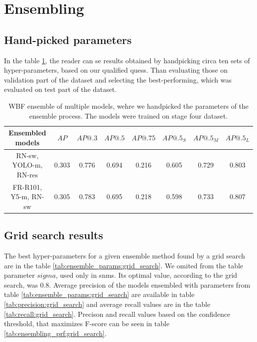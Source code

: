 \section{Ensembling}
\label{sec:ensembling_results}
\subsection{Hand-picked parameters}
In the table \ref{tab:model_ensembling:handpicked}, the reader can se results obtained by handpicking circa ten sets of hyper-parameters, based on our qualified quess. Than evaluating those on validation part of the dataset and selecting the best-performing, which was evaluated on test part of the dataset.
\begin{table}[H]
    \begin{tabular}{|c|c|c|c|c|c|c|c|}
        \hline
        Ensembled models      & $AP$  & $AP@.3$ & $AP@.5$ & $AP@.75$ & $AP@.5_S$ & $AP@.5_M$ & $AP@.5_L$ \\ \hline
        RN-sw, YOLO-m, RN-res & 0.303 & 0.776   & 0.694   & 0.216    & 0.605     & 0.729     & 0.803     \\ \hline
        FR-R101, Y5-m, RN-sw  & 0.305 & 0.783   & 0.695   & 0.218    & 0.598     & 0.733     & 0.807     \\ \hline
    \end{tabular}
    \caption{WBF ensemble of multiple models, wehre we handpicked the parameters of the ensemble process. The models were trained on stage four dataset.}
    \label{tab:model_ensembling:handpicked}
\end{table}
\subsection{Grid search results}
The best hyper-parameters for a given ensemble method found by a grid search are in the table \ref{tab:ensemble_params:grid_search}. We omited from the table parameter $sigma$, used only in snms. Its optimal value, according to the grid search, was $0.8$.
Average precision of the models ensembled with parameters from table \ref{tab:ensemble_params:grid_search} are available in table \ref{tab:precision:grid_search} and average recall values are in the table \ref{tab:recall:grid_search}. Precison and recall values based on the confidence threshold, that maximizes F-score can be seen in table \ref{tab:ensembling_prf:grid_search}.

